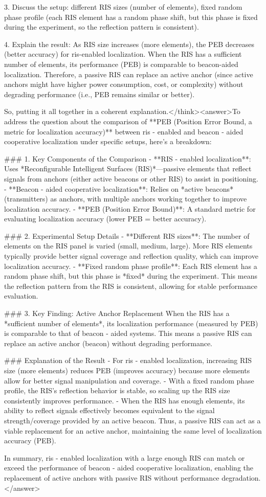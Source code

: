 3. Discuss the setup: different RIS sizes (number of elements), fixed random phase profile (each RIS element has a random phase shift, but this phase is fixed during the experiment, so the reflection pattern is consistent).

4. Explain the result: As RIS size increases (more elements), the PEB decreases (better accuracy) for ris-enabled localization. When the RIS has a sufficient number of elements, its performance (PEB) is comparable to beacon-aided localization. Therefore, a passive RIS can replace an active anchor (since active anchors might have higher power consumption, cost, or complexity) without degrading performance (i.e., PEB remains similar or better).

So, putting it all together in a coherent explanation.</think><answer>To address the question about the comparison of **PEB (Position Error Bound, a metric for localization accuracy)** between ris - enabled and beacon - aided cooperative localization under specific setups, here’s a breakdown:  


### 1. Key Components of the Comparison  
- **RIS - enabled localization**: Uses *Reconfigurable Intelligent Surfaces (RIS)*—passive elements that reflect signals from anchors (either active beacons or other RIS) to assist in positioning.  
- **Beacon - aided cooperative localization**: Relies on *active beacons* (transmitters) as anchors, with multiple anchors working together to improve localization accuracy.  
- **PEB (Position Error Bound)**: A standard metric for evaluating localization accuracy (lower PEB = better accuracy).    

### 2. Experimental Setup Details  
- **Different RIS sizes**: The number of elements on the RIS panel is varied (small, medium, large). More RIS elements typically provide better signal coverage and reflection quality, which can improve localization accuracy.  
- **Fixed random phase profile**: Each RIS element has a random phase shift, but this phase is *fixed* during the experiment. This means the reflection pattern from the RIS is consistent, allowing for stable performance evaluation.    

### 3. Key Finding: Active Anchor Replacement  
When the RIS has a *sufficient number of elements*, its localization performance (measured by PEB) is comparable to that of beacon - aided systems. This means a passive RIS can replace an active anchor (beacon) without degrading performance.  

### Explanation of the Result  
- For ris - enabled localization, increasing RIS size (more elements) reduces PEB (improves accuracy) because more elements allow for better signal manipulation and coverage.  
- With a fixed random phase profile, the RIS’s reflection behavior is stable, so scaling up the RIS size consistently improves performance.  
- When the RIS has enough elements, its ability to reflect signals effectively becomes equivalent to the signal strength/coverage provided by an active beacon. Thus, a passive RIS can act as a viable replacement for an active anchor, maintaining the same level of localization accuracy (PEB).    

In summary, ris - enabled localization with a large enough RIS can match or exceed the performance of beacon - aided cooperative localization, enabling the replacement of active anchors with passive RIS without performance degradation.</answer>